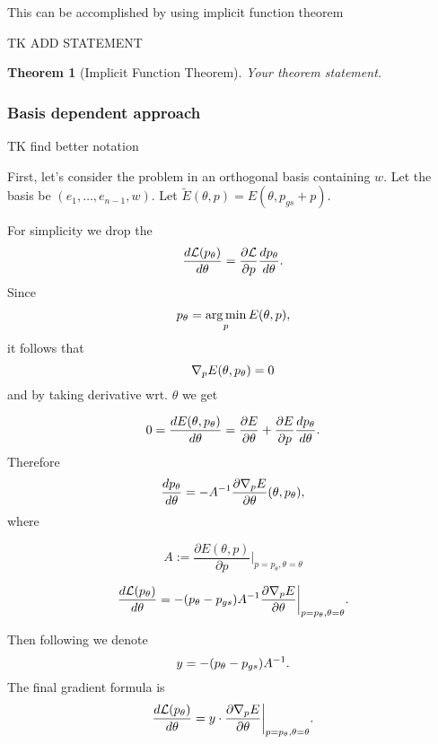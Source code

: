 \documentclass[a4paper,10pt]{report}
\newtheorem{theorem}{Theorem}
\begin{document}
This can be accomplished by using implicit function theorem

TK ADD STATEMENT
\begin{theorem}[Implicit Function Theorem]
Your theorem statement.
\end{theorem}

\subsubsection{Basis dependent approach}
TK find better notation

First, let's consider the problem in an orthogonal basis containing $w$.
Let the basis be $(e_1,\ldots, e_{n-1}, w)$.
Let $\widetilde{E}(\theta, p) = E(\theta, p_{gs}+ p)$.



For simplicity we drop the
\begin{equation}
 \frac{d\mathcal{L}(p_\theta)}{d \theta} = \frac{\partial \mathcal{L}}{\partial p}\frac{dp_\theta}{d \theta}.
\end{equation}
Since
\begin{equation}
 p_\theta = \operatorname*{arg\,min}_p E(\theta, p),
\end{equation}
it follows that
\begin{equation}
 \nabla_p E(\theta, p_\theta) = 0
\end{equation}
and by taking derivative wrt. $\theta$ we get


\begin{equation}
0=\frac{dE(\theta, p_\theta)}{d \theta} = \frac{\partial E}{\partial \theta} + \frac{\partial E}{\partial p} \frac{dp_\theta}{d \theta}.
\end{equation}
Therefore
\begin{equation}
 \frac{dp_\theta}{d \theta} = -A^{-1} \frac{\partial \nabla_p E}{\partial \theta}(\theta, p_\theta),
\end{equation}
where

\begin{equation}
 A := \frac{\partial E(\theta, p)}{\partial p}\bigg|_{p=p_\theta, \theta=\theta}
\end{equation}


\begin{equation}
 \frac{d\mathcal{L}(p_\theta)}{d \theta} = - (p_\theta - p_{gs}) A^{-1}  \frac{\partial \nabla_p E}{\partial \theta}\bigg|_{p=p_\theta, \theta=\theta}.
\end{equation}


Then following \cite{neuralscf} we denote
\begin{equation}
 y = -(p_\theta-p_{gs})A^{-1}.
\end{equation}
The final gradient formula is
\begin{equation}
 \frac{d\mathcal{L}(p_\theta)}{d \theta} = y \cdot \frac{\partial \nabla_p E}{\partial \theta}\bigg|_{p=p_\theta, \theta=\theta}.
\end{equation}
\end{document}
